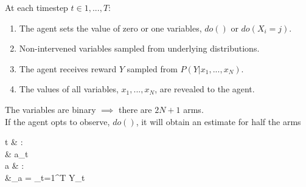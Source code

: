 At each timestep $t \in 1,...,T$:
\begin{enumerate}
\itemsep0em 
\item The agent sets the value of zero or one variables, $do()$ or $do(X_i = j)$.
\item Non-intervened variables sampled from underlying distributions.
\item The agent receives reward $Y$ sampled from $P(Y|x_1,...,x_N)$.
\item The values of all variables, $x_1,...,x_N$, are revealed to the agent.
\end{enumerate}
The variables are binary $\implies$ there are $2N+1$ arms.\\
If the agent opts to observe, $do()$, it will obtain an estimate for half the arms

 t \in & :\\ 
& a_t  \eta \\
 a \in & \actionspace:\\ 
&\hat \mu_a =   \sum_{t=1}^T Y_t 